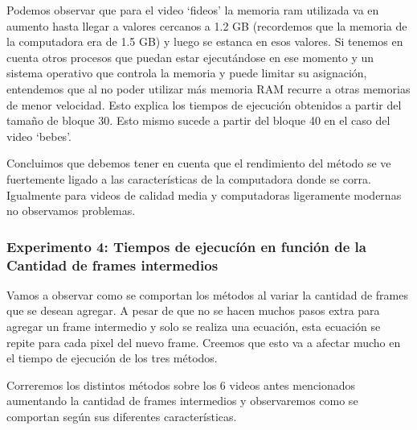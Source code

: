 \FloatBarrier
\par Podemos observar que para el video `fideos' la memoria ram utilizada va en aumento hasta llegar a valores cercanos a 1.2 GB (recordemos que la memoria de la computadora era de 1.5 GB) y luego se estanca en esos valores. Si tenemos en cuenta otros procesos que puedan estar ejecut\'andose en ese momento y un sistema operativo que controla la memoria y puede limitar su asignaci\'on, entendemos que al no poder utilizar m\'as memoria RAM recurre a otras memorias de menor velocidad. Esto explica los tiempos de ejecuci\'on obtenidos a partir del tama\~no de bloque 30. Esto mismo sucede a partir del bloque 40 en el caso del video `bebes'.
\par Concluimos que debemos tener en cuenta que el rendimiento del m\'etodo se ve fuertemente ligado a las caracter\'isticas de la computadora donde se corra. Igualmente para videos de calidad media y computadoras ligeramente modernas no observamos problemas.

\subsubsection{Experimento 4: Tiempos de ejecucí\'on en funci\'on de la Cantidad de frames intermedios}
\par Vamos a observar como se comportan los m\'etodos al variar la cantidad de frames que se desean agregar. A pesar de que no se hacen muchos pasos extra para agregar un frame intermedio y solo se realiza una ecuaci\'on, esta ecuaci\'on se repite para cada pixel del nuevo frame. Creemos que esto va a afectar mucho en el tiempo de ejecuci\'on de los tres m\'etodos.
\par Correremos los distintos m\'etodos sobre los 6 videos antes mencionados aumentando la cantidad de frames intermedios y observaremos como se comportan seg\'un sus diferentes caracter\'isticas.

